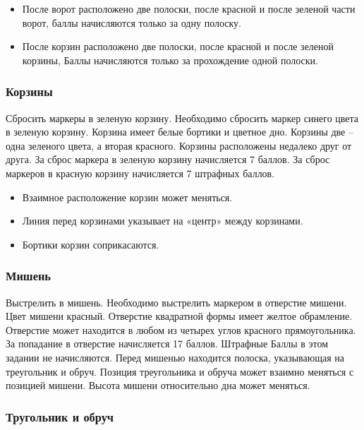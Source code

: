 \begin{itemize}
    \item После ворот расположено две полоски, после красной и после зеленой части ворот, баллы начисляются только за одну полоску.
    \item После корзин расположено две полоски, после красной и после зеленой корзины, Баллы начисляются только за прохождение одной полоски.
\end{itemize}

\subsubsection*{Корзины}


Сбросить маркеры в зеленую корзину. Необходимо сбросить маркер синего цвета в зеленую корзину. Корзина имеет белые бортики и цветное дно. Корзины две – одна зеленого цвета, а вторая красного. Корзины расположены недалеко друг от друга. За сброс маркера в зеленую корзину начисляется 7 баллов. За сброс маркеров в красную корзину начисляется 7 штрафных баллов.  

\begin{itemize}
    \item Взаимное расположение корзин может меняться.
    \item Линия перед корзинами указывает на «центр» между корзинами.
    \item Бортики корзин соприкасаются.
\end{itemize}

\subsubsection*{Мишень}


Выстрелить в мишень. Необходимо выстрелить маркером в отверстие мишени. Цвет мишени красный. Отверстие квадратной формы имеет желтое обрамление. Отверстие может находится в любом из четырех углов красного прямоугольника. За попадание в отверстие начисляется 17 баллов. Штрафные Баллы в этом задании не начисляются.  Перед мишенью находится полоска, указывающая на треугольник и обруч.  Позиция  треугольника и обруча может взаимно меняться с позицией мишени. Высота  мишени относительно дна может меняться.

\subsubsection*{Тругольник и обруч}

